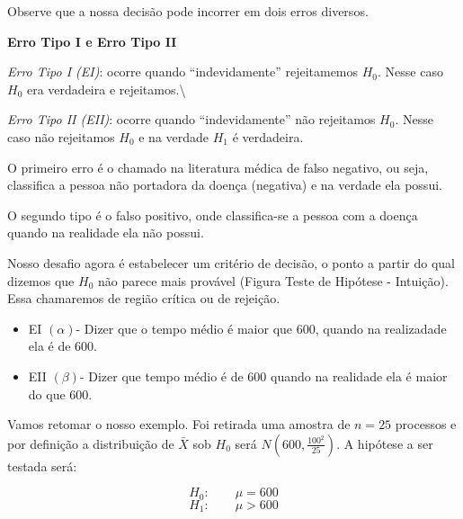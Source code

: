 \documentclass[
  letterpaper,
  DIV=11,
  numbers=noendperiod]{scrreprt}
\providecommand{\tightlist}{%
  \setlength{\itemsep}{0pt}\setlength{\parskip}{0pt}}
\begin{document}
Observe que a nossa decisão pode incorrer em dois erros diversos.

\begin{tcolorbox}[enhanced jigsaw, leftrule=.75mm, coltitle=black, colframe=quarto-callout-note-color-frame, toprule=.15mm, opacitybacktitle=0.6, bottomtitle=1mm, bottomrule=.15mm, titlerule=0mm, toptitle=1mm, title=\textcolor{quarto-callout-note-color}{\faInfo}\hspace{0.5em}{Erro Tipo I e Erro Tipo II}, arc=.35mm, breakable, opacityback=0, colbacktitle=quarto-callout-note-color!10!white, colback=white, left=2mm, rightrule=.15mm]

\textbf{Erro Tipo I e Erro Tipo II}

\emph{Erro Tipo I (EI)}: ocorre quando ``indevidamente'' rejeitamemos
\(H_0\). Nesse caso \(H_0\) era verdadeira e rejeitamos.\textbackslash{}

\emph{Erro Tipo II (EII)}: ocorre quando ``indevidamente'' não
rejeitamos \(H_0\). Nesse caso não rejeitamos \(H_0\) e na verdade
\(H_1\) é verdadeira.

\end{tcolorbox}

O primeiro erro é o chamado na literatura médica de falso negativo, ou
seja, classifica a pessoa não portadora da doença (negativa) e na
verdade ela possui.

O segundo tipo é o falso positivo, onde classifica-se a pessoa com a
doença quando na realidade ela não possui.

Nosso desafio agora é estabelecer um critério de decisão, o ponto a
partir do qual dizemos que \(H_0\) não parece mais provável (Figura
Teste de Hipótese - Intuição). Essa chamaremos de região crítica ou de
rejeição.

\begin{itemize}
\tightlist
\item
  EI \((\alpha)\)- Dizer que o tempo médio é maior que 600, quando na
  realizadade ela é de 600.
\item
  EII \((\beta)\)- Dizer que tempo médio é de 600 quando na realidade
  ela é maior do que 600.
\end{itemize}

Vamos retomar o nosso exemplo. Foi retirada uma amostra de \(n=25\)
processos e por definição a distribuição de \(\bar{X}\) sob \(H_0\) será
\(N(600,\frac{100^2}{25})\). A hipótese a ser testada será:

\[H_0: \qquad \mu=600\] \[H_1: \qquad \mu>600\]
\end{document}
